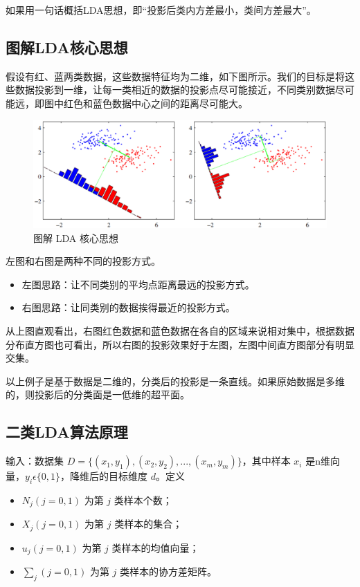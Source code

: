 如果用一句话概括LDA思想，即“投影后类内方差最小，类间方差最大”。

\subsection{图解LDA核心思想}

假设有红、蓝两类数据，这些数据特征均为二维，如下图所示。我们的目标是将这些数据投影到一维，让每一类相近的数据的投影点尽可能接近，不同类别数据尽可能远，即图中红色和蓝色数据中心之间的距离尽可能大。

 \begin{figure}[h]
   \centering
   \includegraphics[width=.9\textwidth]{imgs/2.29.1.eps}
   \caption{图解 LDA 核心思想}
   \label{fig:2.29.1}
 \end{figure}

左图和右图是两种不同的投影方式。

\begin{itemize}
\itemsep0em 
	\item 左图思路：让不同类别的平均点距离最远的投影方式。
	\item 右图思路：让同类别的数据挨得最近的投影方式。
\end{itemize}

从上图直观看出，右图红色数据和蓝色数据在各自的区域来说相对集中，根据数据分布直方图也可看出，所以右图的投影效果好于左图，左图中间直方图部分有明显交集。

以上例子是基于数据是二维的，分类后的投影是一条直线。如果原始数据是多维的，则投影后的分类面是一低维的超平面。

\subsection{二类LDA算法原理}

输入：数据集 $D=\{( x_1, y_1),( x_2, y_2),...,( x_m, y_m)\}$，其中样本 $ x_i $ 是n维向量，$ y_i  \epsilon \{0, 1\}$，降维后的目标维度 $d$。定义

\begin{itemize}
	\itemsep0em 
	\item	$N_j(j=0,1)$ 为第 $j$ 类样本个数；
	\item	$X_j(j=0,1)$ 为第 $j$ 类样本的集合；
	\item	$u_j(j=0,1)$ 为第 $j$ 类样本的均值向量；
	\item	$\sum_j(j=0,1)$ 为第 $j$ 类样本的协方差矩阵。
\end{itemize}

